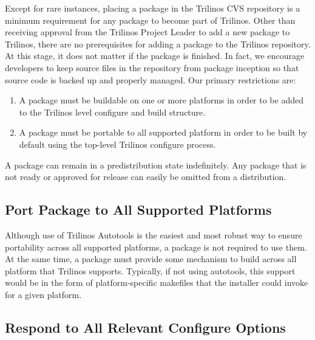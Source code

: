 \documentclass[12pt,relax]{TrilinosDevGuide}
\begin{document}
Except for rare instances, placing a package in the Trilinos CVS
repository is a minimum requirement for any package to become part of 
Trilinos.  Other than receiving approval from the Trilinos Project Leader to 
add a new package to Trilinos, there are no prerequisites for adding a  
package to the Trilinos repository.  At this stage, it does not matter if the 
package is finished.  In fact, we encourage
developers to keep source files in the repository from package
inception so that source code is backed up and properly managed.
Our primary restrictions are:
\begin{enumerate}
\item A package must be buildable on one or more platforms in order to
be added to the Trilinos level configure and build 
structure.  
\item A package must be portable to all supported platform in order to
be built by default using the top-level Trilinos configure process.
\end{enumerate}

\begin{minipage}[c]{\textwidth}

\begin{minipage}[l]{.6\textwidth}

A package can remain in a predistribution state indefinitely.  
Any package that is not ready or approved for 
release can easily be omitted from a distribution.
\end{minipage}\hfill
{}
\end{minipage}

\subsection{Port Package to All Supported Platforms}
Although use of Trilinos Autotools is the easiest and most robust way
to ensure portability across all supported platforms, a package is not
required to use them.  At the same time, a package must provide some
mechanism to build across all platform that Trilinos supports.
Typically, if not using autotools, this support would be in the form
of platform-specific makefiles that the installer could invoke for a
given platform.

\subsection{Respond to All Relevant Configure Options}
\end{document}
